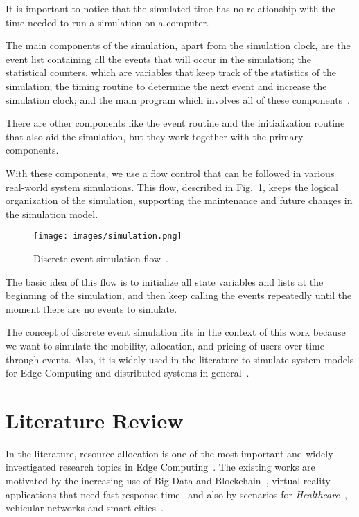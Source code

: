 \documentclass[English]{ic-tese-v3}
\begin{document}
It is important to notice that the simulated time has no relationship with the time needed to run a simulation on a computer.

The main components of the simulation, apart from the simulation clock, are the event list containing all the events that will occur in the simulation; the statistical counters, which are variables that keep track of the statistics of the simulation; the timing routine to determine the next event and increase the simulation clock; and the main program which involves all of these components~\cite{AverilSim2014}.

There are other components like the event routine and the initialization routine that also aid the simulation, but they work together with the primary components.

With these components, we use a flow control that can be followed in various real-world system simulations. This flow, described in Fig.~\ref{fig:des}, keeps the logical organization of the simulation, supporting the maintenance and future changes in the simulation model.
\begin{figure}
    \centering
    \texttt{[image: images/simulation.png]}
    \caption{Discrete event simulation flow~\cite{AverilSim2014}.}
    \label{fig:des}
\end{figure}

The basic idea of this flow is to initialize all state variables and lists at the beginning of the simulation, and then keep calling the events repeatedly until the moment there are no events to simulate.

The concept of discrete event simulation fits in the context of this work because we want to simulate the mobility, allocation, and pricing of users over time through events. Also, it is widely used in the literature to simulate system models for Edge Computing and distributed systems in general~\cite{IoTJha2020, MartinezFog2021, HabibaReverse2019, GuptaiFogSim2017}.

\chapter{Literature Review}
\label{ch:lit_review}

In the literature, resource allocation is one of the most important and widely investigated research topics in Edge Computing~\cite{Li2020Online}. The existing works are motivated by the increasing use of Big Data and Blockchain~\cite{LeeBlockchain2020}, virtual reality applications that need fast response time~\cite{TasiEdgeMAP2018} and also by scenarios for \emph{Healthcare}~\cite{AbdelmoneemHealth2020}, vehicular networks and smart cities~\cite{LeeBlockchain2020, KlaimiVehicularFog2018, PorambageSurvey2018}. 
\end{document}
